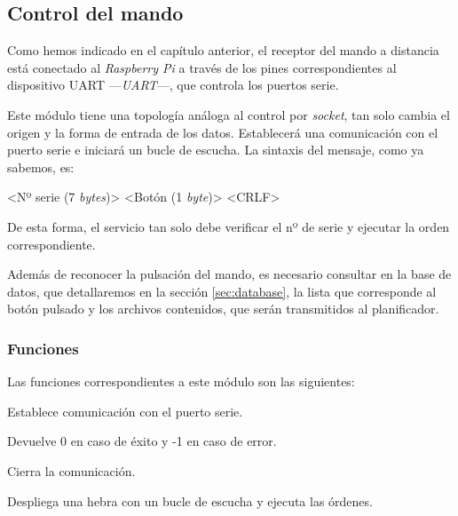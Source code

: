 \smallskip

\subsection{Control del mando}
\label{subsec:daemon_mando}

Como hemos indicado en el capítulo anterior, el receptor del mando a distancia está conectado al \textit{Raspberry Pi} a través de los pines correspondientes al dispositivo \acrshort{UART} ---\textit{\acrlong{UART}}---, que controla los puertos serie. \cite{wiki_uart}

Este módulo tiene una topología análoga al control por \textit{socket}, tan solo cambia el origen y la forma de entrada de los datos. Establecerá una comunicación con el puerto serie e iniciará un bucle de escucha. La sintaxis del mensaje, como ya sabemos, es:

\begin{center}
	<Nº serie (7 \textit{bytes})> <Botón (1 \textit{byte})> <CRLF>
\end{center}

De esta forma, el servicio tan solo debe verificar el nº de serie y ejecutar la orden correspondiente.

Además de reconocer la pulsación del mando, es necesario consultar en la base de datos, que detallaremos en la sección \ref{sec:database}, la lista que corresponde al botón pulsado y los archivos contenidos, que serán transmitidos al planificador.

\subsubsection{Funciones}

Las funciones correspondientes a este módulo son las siguientes:

\begin{description}[style=nextline]
	\item[uart\_init () : \textit{dword}]
	Establece comunicación con el puerto serie.
	
	Devuelve 0 en caso de éxito y -1 en caso de error.
	
	\item[uart\_destroy ()]
	Cierra la comunicación.
	
	\item[uart\_loop ()]
	Despliega una hebra con un bucle de escucha y ejecuta las órdenes.
	
\end{description}

